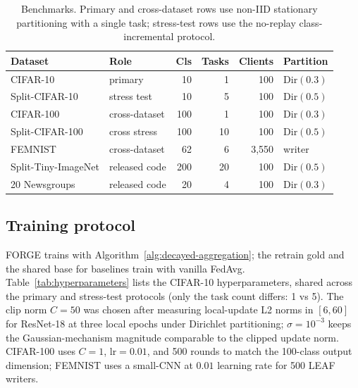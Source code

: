 \begin{table}[t]
\centering
\scriptsize
\setlength{\tabcolsep}{3pt}
\begin{tabular}{llrrrl}
\toprule
Dataset & Role & Cls & Tasks & Clients & Partition \\
\midrule
CIFAR-10            & primary       & 10  & 1  & 100   & Dir$(0.3)$ \\
Split-CIFAR-10      & stress test   & 10  & 5  & 100   & Dir$(0.5)$ \\
CIFAR-100           & cross-dataset & 100 & 1  & 100   & Dir$(0.3)$ \\
Split-CIFAR-100     & cross stress  & 100 & 10 & 100   & Dir$(0.5)$ \\
FEMNIST             & cross-dataset & 62  & 6  & 3{,}550 & writer \\
Split-Tiny-ImageNet & released code & 200 & 20 & 100   & Dir$(0.5)$ \\
20 Newsgroups       & released code & 20  & 4  & 100   & Dir$(0.3)$ \\
\bottomrule
\end{tabular}
\caption{Benchmarks. Primary and cross-dataset rows use non-IID stationary
partitioning with a single task; stress-test rows use the no-replay
class-incremental protocol.}
\label{tab:datasets}
\end{table}

\subsection{Training protocol}
\label{sec:experiments-protocol}

FORGE trains with Algorithm~\ref{alg:decayed-aggregation}; the retrain gold and the
shared base for baselines train with vanilla FedAvg. Table~\ref{tab:hyperparameters}
lists the CIFAR-10 hyperparameters, shared across the primary and stress-test
protocols (only the task count differs: 1 vs 5). The clip norm $C{=}50$ was
chosen after measuring local-update L2 norms in $[6, 60]$ for ResNet-18 at three
local epochs under Dirichlet partitioning; $\sigma{=}10^{-3}$ keeps the
Gaussian-mechanism magnitude comparable to the clipped update norm. CIFAR-100 uses
$C{=}1$, $\mathrm{lr}{=}0.01$, and 500 rounds to match the 100-class output
dimension; FEMNIST uses a small-CNN at $0.01$ learning rate for 500 LEAF writers.

